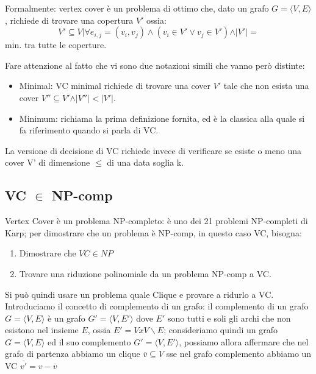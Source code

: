 \documentclass[12pt,a4paper]{article}
\begin{document}
Formalmente: vertex cover è un problema di ottimo che, dato un grafo $G = \langle V, E\rangle$, richiede di trovare una copertura $V'$ ossia: $$V' \subseteq V \vert \forall e_{i, j} = (v_i, v_j) \wedge (v_i \in V' \vee v_j \in V') \wedge \vert V' \vert =$$ min. tra tutte le coperture.

Fare attenzione al fatto che vi sono due notazioni simili che vanno però distinte:
\begin{itemize}
\item Minimal: VC minimal richiede di trovare una cover $V'$ tale che non esista una cover $V'' \subseteq V' \wedge \vert V'' \vert < \vert V' \vert$.

\item Minimum: richiama la prima definizione fornita, ed è la classica alla quale si fa riferimento quando si parla di VC.
\end{itemize}

La versione di decisione di VC richiede invece di verificare se esiste o meno una cover V' di dimensione $\leq$ di una data soglia k.

\subsection{VC $\in$ NP-comp}
Vertex Cover è un problema NP-completo: è uno dei 21 problemi NP-completi di Karp; per dimostrare che un problema è NP-comp, in questo caso VC, bisogna:
\begin{enumerate}
\item Dimostrare che $VC \in NP$
\item Trovare una riduzione polinomiale da un problema NP-comp a VC.
\end{enumerate}
Si può quindi usare un problema quale Clique e provare a ridurlo a VC. Introduciamo il concetto di complemento di un grafo: il complemento di un grafo $G = \langle V, E \rangle$ è un grafo $G' = \langle V, E' \rangle$ dove $E'$ sono tutti e soli gli archi che non esistono nel insieme $E$, ossia $E' = {V x V} \backslash E$; consideriamo quindi un grafo $G = \langle V, E \rangle$ ed il suo complemento $G' = \langle V, E' \rangle$, possiamo allora affermare che nel grafo di partenza abbiamo un clique $\overline{v} \subseteq V$ sse nel grafo complemento abbiamo un VC $\overline{v'} = v - \overline{v}$
\end{document}
